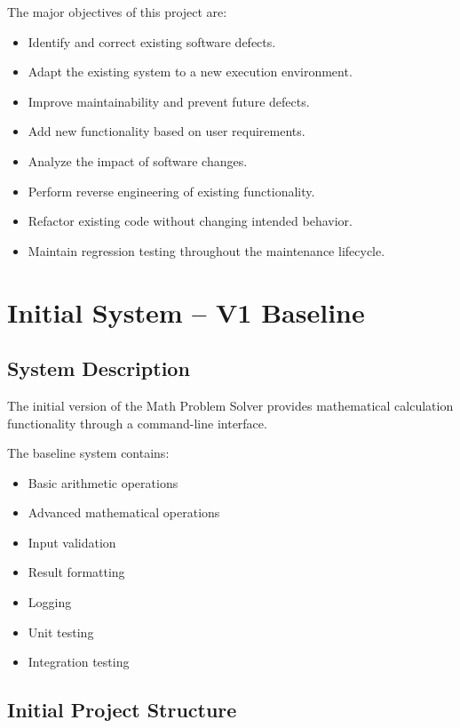 \documentclass[12pt,a4paper,openany]{report}
\begin{document}
The major objectives of this project are:

\begin{itemize}
    \item Identify and correct existing software defects.
    \item Adapt the existing system to a new execution environment.
    \item Improve maintainability and prevent future defects.
    \item Add new functionality based on user requirements.
    \item Analyze the impact of software changes.
    \item Perform reverse engineering of existing functionality.
    \item Refactor existing code without changing intended behavior.
    \item Maintain regression testing throughout the maintenance
          lifecycle.
\end{itemize}


\chapter{Initial System -- V1 Baseline}

\section{System Description}

The initial version of the Math Problem Solver provides mathematical
calculation functionality through a command-line interface.

The baseline system contains:

\begin{itemize}
    \item Basic arithmetic operations
    \item Advanced mathematical operations
    \item Input validation
    \item Result formatting
    \item Logging
    \item Unit testing
    \item Integration testing
\end{itemize}

\section{Initial Project Structure}
\end{document}
